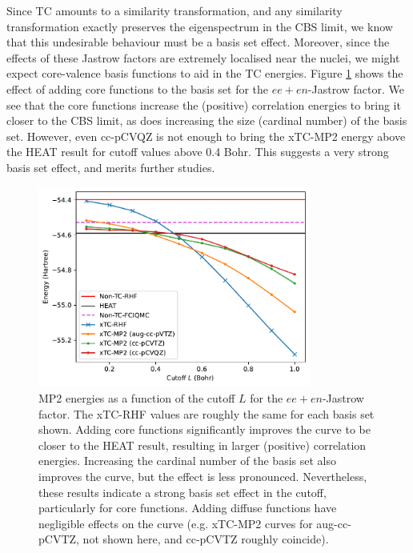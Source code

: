 Since TC amounts to a similarity transformation, and any similarity transformation exactly preserves the eigenspectrum in the CBS limit, we know that this undesirable behaviour must be a basis set effect. Moreover, since the effects of these Jastrow factors are extremely localised near the nuclei, we might expect core-valence basis functions to aid in the TC energies. Figure \ref{fig:basis-vs-cutoff} shows the effect of adding core functions to the basis set for the $ee+en$-Jastrow factor. We see that the core functions increase the (positive) correlation energies to bring it closer to the CBS limit, as does increasing the size (cardinal number) of the basis set. However, even cc-pCVQZ is not enough to bring the xTC-MP2 energy above the HEAT result for cutoff values above 0.4 Bohr. This suggests a very strong basis set effect, and merits further studies.

\begin{figure}[h!]
    \centering
    \includegraphics[width=0.8\textwidth]{figures/universal/cutoffs_basis.pdf}
    \caption{MP2 energies as a function of the cutoff $L$ for the $ee+en$-Jastrow factor. The xTC-RHF values are roughly the same for each basis set shown. Adding core functions significantly improves the curve to be closer to the HEAT result, resulting in larger (positive) correlation energies. Increasing the cardinal number of the basis set also improves the curve, but the effect is less pronounced. Nevertheless, these results indicate a strong basis set effect in the cutoff, particularly for core functions.
    Adding diffuse functions have negligible effects on the curve (e.g. xTC-MP2 curves for aug-cc-pCVTZ, not shown here, and cc-pCVTZ roughly coincide).}
    \label{fig:basis-vs-cutoff}
\end{figure}

